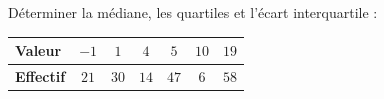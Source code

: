 \begin{exo}
	Déterminer la médiane, les quartiles et l'écart interquartile :

	\begin{center}
		\def\arraystretch{1.4}
		\begin{tabular}{|l|*{6}{c|}} \hline
			\textbf{Valeur}   & $-1$ & $1$  & $4$  & $5$  & $10$ & $19$ \\ \hline
			\textbf{Effectif} & $21$ & $30$ & $14$ & $47$ & $6$  & $58$ \\ \hline
		\end{tabular}
	\end{center}
\end{exo}

